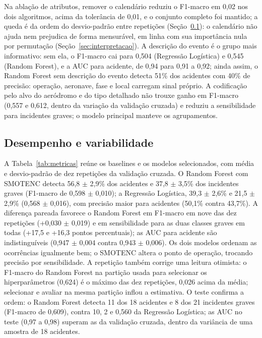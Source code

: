 \documentclass[12pt]{article}
\begin{document}
Na ablação de atributos, remover o calendário reduziu o F1-macro em 0,02 nos dois algoritmos, acima da tolerância de 0,01, e o conjunto completo foi mantido; a queda é da ordem do desvio-padrão entre repetições (Seção~\ref{sec:desempenho}): o calendário não ajuda nem prejudica de forma mensurável, em linha com sua importância nula por permutação (Seção~\ref{sec:interpretacao}). A descrição do evento é o grupo mais informativo: sem ela, o F1-macro cai para 0,504 (Regressão Logística) e 0,545 (Random Forest), e a AUC para acidente, de 0,94 para 0,91 a 0,92; ainda assim, o Random Forest sem descrição do evento detecta 51\% dos acidentes com 40\% de precisão: operação, aeronave, fase e local carregam sinal próprio. A codificação pelo alvo do aeródromo e do tipo detalhado não trouxe ganho em F1-macro (0,557 e 0,612, dentro da variação da validação cruzada) e reduziu a sensibilidade para incidentes graves; o modelo principal manteve os agrupamentos.

\begin{table}[htbp]
    \centering
    \caption{Seleção dos modelos: F1-macro na validação cruzada (média $\pm$ desvio-padrão entre dobras) e métricas \textit{out-of-fold} no treino, em \%, para acidentes (AC) e incidentes graves (IG); $\dagger$ configuração selecionada}
    \vspace{0.05cm}
    \scriptsize\setlength{\tabcolsep}{3.5pt}\renewcommand{\arraystretch}{0.88}
    
    \label{tab:selecao}
\end{table}

\subsection{Desempenho e variabilidade}
\label{sec:desempenho}

A Tabela~\ref{tab:metricas} reúne os baselines e os modelos selecionados, com média e desvio-padrão de dez repetições da validação cruzada. O Random Forest com SMOTENC detecta 56,8 $\pm$ 2,9\% dos acidentes e 37,8 $\pm$ 3,5\% dos incidentes graves (F1-macro de 0,598 $\pm$ 0,010); a Regressão Logística, 39,3 $\pm$ 2,6\% e 21,5 $\pm$ 2,9\% (0,568 $\pm$ 0,016), com precisão maior para acidentes (50,1\% contra 43,7\%). A diferença pareada favorece o Random Forest em F1-macro em nove das dez repetições (+0,030 $\pm$ 0,019) e em sensibilidade para as duas classes graves em todas (+17,5 e +16,3 pontos percentuais); as AUC para acidente são indistinguíveis (0,947 $\pm$ 0,004 contra 0,943 $\pm$ 0,006). Os dois modelos ordenam as ocorrências igualmente bem; o SMOTENC altera o ponto de operação, trocando precisão por sensibilidade. A repetição também corrige uma leitura otimista: o F1-macro do Random Forest na partição usada para selecionar os hiperparâmetros (0,624) é o máximo das dez repetições, 0,026 acima da média; selecionar e avaliar na mesma partição inflou a estimativa. O teste confirma a ordem: o Random Forest detecta 11 dos 18 acidentes e 8 dos 21 incidentes graves (F1-macro de 0,609), contra 10, 2 e 0,560 da Regressão Logística; as AUC no teste (0,97 a 0,98) superam as da validação cruzada, dentro da variância de uma amostra de 18 acidentes.
\end{document}
